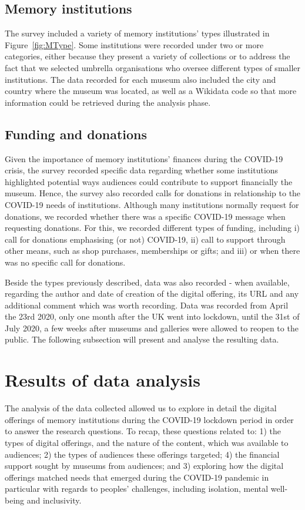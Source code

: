 \documentclass{egpubl}
\begin{document}
\subsection{Memory institutions}
The survey included a variety of memory institutions’ types illustrated in Figure~\ref{fig:MType}. Some institutions were recorded under two or more categories, either because they present a variety of collections or to address the fact that we selected umbrella organisations who oversee different types of smaller institutions. The data recorded for each museum also included the city and country where the museum was located, as well as a Wikidata code so that more information could be retrieved during the analysis phase.

\subsection{Funding and donations}
Given the importance of memory institutions’ finances during the COVID-19 crisis, the survey recorded specific data regarding whether some institutions highlighted potential ways audiences could contribute to support financially the museum. Hence, the survey also recorded calls for donations in relationship to the COVID-19 needs of institutions. Although many institutions normally request for donations, we recorded whether there was a specific COVID-19 message when requesting donations. For this, we recorded different types of funding, including i) call for donations emphasising (or not)  COVID-19, ii) call to support through other means, such as shop purchases, memberships or gifts; and iii) or when there was no specific call for donations.

Beside the types previously described, data was also recorded - when available, regarding the author and date of creation of the digital offering, its URL and any additional comment which was worth recording. Data was recorded from April the 23rd 2020, only one month after the UK went into lockdown, until the 31st of July 2020, a few weeks after museums and galleries were allowed to reopen to the public. The following subsection will present and analyse the resulting data. 


\section{Results of data analysis}
The analysis of the data collected allowed us to explore in detail the digital offerings of memory institutions during the COVID-19 lockdown period in order to answer the research questions. To recap, these questions related to: 1) the types of digital offerings, and the nature of the content, which was available to audiences; 2) the types of audiences these offerings targeted; 4) the financial support sought by museums from audiences; and 3) exploring how the digital offerings matched needs that emerged during the COVID-19 pandemic in particular with regards to peoples’ challenges, including isolation, mental well-being and inclusivity. 
\end{document}
